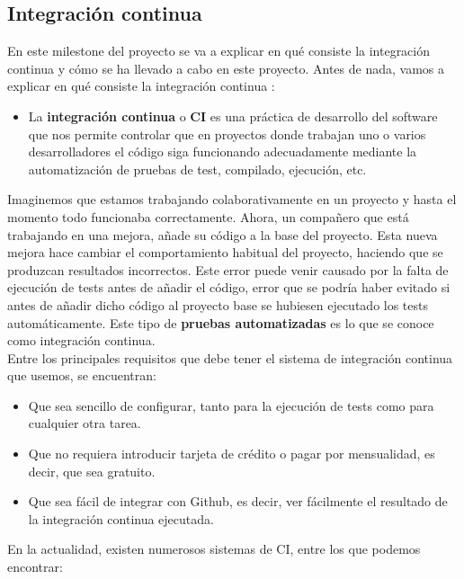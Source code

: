 \subsection{Integración continua}
En este milestone del proyecto se va a explicar en qué consiste la integración continua y
cómo se ha llevado a cabo en este proyecto. Antes de nada, vamos a explicar en qué consiste
la integración continua \cite{continuous-integration}:

    \begin{itemize}
        \item La \textbf{integración continua} o \textbf{CI} es una práctica de desarrollo
        del software que nos permite controlar que en proyectos donde trabajan uno o varios
        desarrolladores el código siga funcionando adecuadamente mediante la automatización
        de pruebas de test, compilado, ejecución, etc.
    \end{itemize}

Imaginemos que estamos trabajando colaborativamente en un proyecto y hasta el momento todo
funcionaba correctamente. Ahora, un compañero que está trabajando en una mejora, añade su
código a la base del proyecto. Esta nueva mejora hace cambiar el comportamiento habitual del
proyecto, haciendo que se produzcan resultados incorrectos. Este error puede venir causado
por la falta de ejecución de tests antes de añadir el código, error que se podría haber
evitado si antes de añadir dicho código al proyecto base se hubiesen ejecutado los tests
automáticamente. Este tipo de \textbf{pruebas automatizadas} es lo que se conoce como
integración continua.\\

Entre los principales requisitos que debe tener el sistema de integración continua que
usemos, se encuentran:

    \begin{itemize}
        \item Que sea sencillo de configurar, tanto para la ejecución de tests como para
        cualquier otra tarea.
        \item Que no requiera introducir tarjeta de crédito o pagar por mensualidad, es
        decir, que sea gratuito.
        \item Que sea fácil de integrar con Github, es decir, ver fácilmente el resultado
        de la integración continua ejecutada.
    \end{itemize}

En la actualidad, existen numerosos sistemas de CI, entre los que podemos encontrar:

